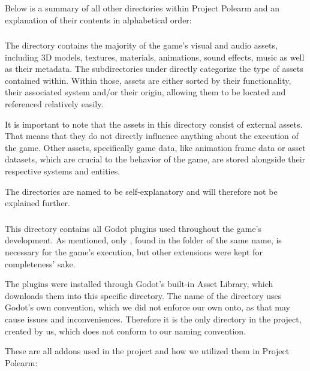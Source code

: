\documentclass[../Main.tex]{subfiles}
\begin{document}
Below is a summary of all other directories within Project Polearm and an explanation of their contents in alphabetical order:

\subsubsection{}\label{sec:assets}

The  directory contains the majority of the game's visual and audio assets, including 3D models, textures, materials, animations, sound effects, music as well as their metadata. The subdirectories under  directly categorize the type of assets contained within. Within those, assets are either sorted by their functionality, their associated system and/or their origin, allowing them to be located and referenced relatively easily.

It is important to note that the assets in this directory consist of external assets. That means that they do not directly influence anything about the execution of the game. Other assets, specifically game data, like animation frame data or asset datasets, which are crucial to the behavior of the game, are stored alongside their respective systems and entities.

The directories are named to be self-explanatory and will therefore not be explained further.

\subsubsection{}\label{sec:addons}

This directory contains all Godot plugins used throughout the game's development. As mentioned, only , found in the folder of the same name, is necessary for the game's execution, but other extensions were kept for completeness' sake.

The plugins were installed through Godot's built-in Asset Library, which downloads them into this specific directory. The name of the directory uses Godot's own convention, which we did not enforce our own onto, as that may cause issues and inconveniences. Therefore it is the only directory in the project, created by us, which does not conform to our naming convention.

These are all addons used in the project and how we utilized them in Project Polearm:
\end{document}
